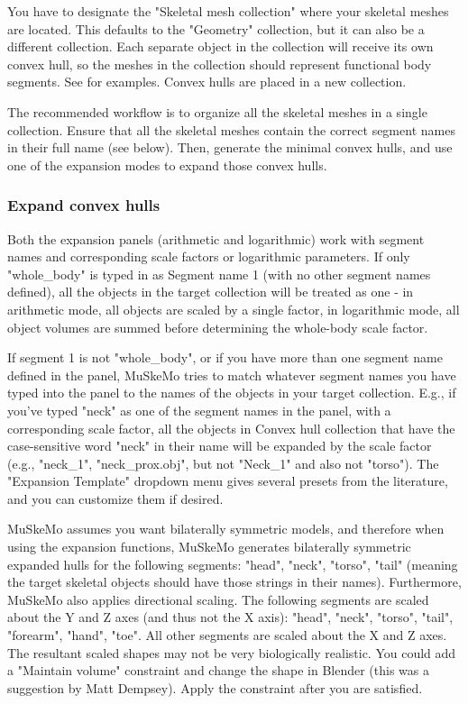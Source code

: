 \documentclass{article}
\begin{document}
You have to designate the "Skeletal mesh collection" where your skeletal meshes are located. This defaults to the "Geometry" collection, but it can also be a different collection. Each separate object in the collection will receive its own convex hull, so the meshes in the collection should represent functional body segments. See \cite{sellersMinimumConvexHull2012a,coathamConvexHullEstimation2021, macaulayDecouplingBodyShape2023} for examples. Convex hulls are placed in a new collection. 

The recommended workflow is to organize all the skeletal meshes in a single collection. Ensure that all the skeletal meshes contain the correct segment names in their full name (see below). Then, generate the minimal convex hulls, and use one of the expansion modes to expand those convex hulls.


\subsubsection{Expand convex hulls} 

Both the expansion panels (arithmetic and logarithmic) work with segment names and corresponding scale factors or logarithmic parameters. If only "whole\_body" is typed in as Segment name 1 (with no other segment names defined), all the objects in the target collection will be treated as one - in arithmetic mode, all objects are scaled by a single factor, in logarithmic mode, all object volumes are summed before determining the whole-body scale factor. 

If segment 1 is not "whole\_body", or if you have more than one segment name defined in the panel, MuSkeMo tries to match whatever segment names you have typed into the panel to the names of the objects in your target collection. E.g., if you've typed "neck" as one of the segment names in the panel, with a corresponding scale factor, all the objects in Convex hull collection that have the case-sensitive word "neck" in their name will be expanded by the scale factor (e.g., "neck\_1", "neck\_prox.obj", but not "Neck\_1" and also not "torso"). The "Expansion Template" dropdown menu gives several presets from the literature, and you can customize them if desired.

MuSkeMo assumes you want bilaterally symmetric models, and therefore when using the expansion functions, MuSkeMo generates bilaterally symmetric expanded hulls for the following segments: "head", "neck", "torso", "tail" (meaning the target skeletal objects should have those strings in their names). Furthermore, MuSkeMo also applies directional scaling. The following segments are scaled about the Y and Z axes (and thus not the X axis): "head", "neck", "torso", "tail", "forearm", "hand", "toe". All other segments are scaled about the X and Z axes. The resultant scaled shapes may not be very biologically realistic. You could add a "Maintain volume" constraint and change the shape in Blender (this was a suggestion by Matt Dempsey). Apply the constraint after you are satisfied.
\end{document}
